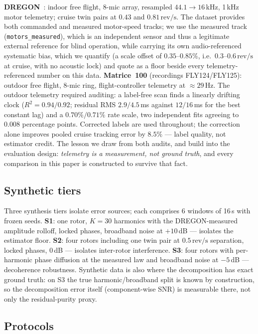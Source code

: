 \documentclass[journal]{IEEEtran}
\newcommand{\revps}{\ensuremath{\,\mathrm{rev/s}}}
\begin{document}
\textbf{DREGON}~\cite{strauss2018dregon}: indoor free flight, 8-mic
array, resampled $44.1 \to 16$\,kHz, 1\,kHz motor telemetry; cruise twin
pairs at $0.43$ and $0.81\revps$. The dataset provides both commanded
and measured motor-speed tracks; we use the measured track
(\texttt{motors\_measured}), which is an independent sensor and thus a
legitimate external reference for blind operation, while carrying its own
audio-referenced systematic bias, which we quantify (a scale offset of
$0.35$--$0.85\%$, i.e.\ $0.3$--$0.6\revps$ at cruise, with no acoustic
lock) and quote as a floor beside every telemetry-referenced number on
this data. \textbf{Matrice~100} (recordings FLY124/FLY125): outdoor
free flight, 8-mic ring, flight-controller telemetry at
${\approx}29$\,Hz. The outdoor telemetry required auditing: a label-free
scan finds a linearly drifting clock ($R^2 = 0.94/0.92$; residual RMS
$2.9/4.5$\,ms against $12/16$\,ms for the best constant lag) and a
$0.70\%/0.71\%$ rate scale, two independent fits agreeing to $0.008$
percentage points. Corrected labels are used throughout; the correction
alone improves pooled cruise tracking error by $8.5\%$ --- label
quality, not estimator credit. The lesson we draw from both audits, and
build into the evaluation design: \emph{telemetry is a measurement, not
ground truth}, and every comparison in this paper is constructed to
survive that fact.

\subsection{Synthetic tiers}
Three synthesis tiers isolate error sources; each comprises 6 windows of
16\,s with frozen seeds. \textbf{S1}: one rotor, $K = 30$ harmonics with
the DREGON-measured amplitude rolloff, locked phases, broadband noise at
$+10$\,dB --- isolates the estimator floor. \textbf{S2}: four rotors
including one twin pair at $0.5\revps$ separation, locked phases, 0\,dB
--- isolates inter-rotor interference. \textbf{S3}: four rotors with
per-harmonic phase diffusion at the measured law and broadband noise at
$-5$\,dB --- decoherence robustness. Synthetic data is also where the
decomposition has exact ground truth: on S3 the true harmonic/broadband
split is known by construction, so the decomposition error itself
(component-wise SNR) is measurable there, not only the residual-purity
proxy.

\subsection{Protocols}
\label{sec:protocols}
\end{document}
